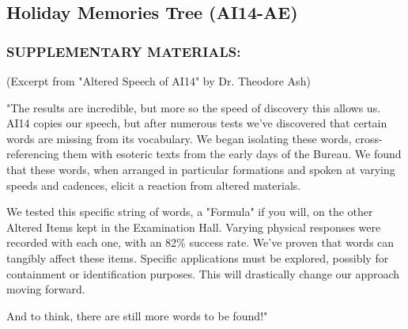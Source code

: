 \subsection*{Holiday Memories Tree (AI14-AE)}
\subsubsection*{SUPPLEMENTARY MATERIALS:}
\par (Excerpt from "Altered Speech of AI14" by Dr. Theodore Ash)
\par "The results are incredible, but more so the speed of discovery
this allows us. AI14 copies our speech, but after numerous tests
we've discovered that certain words are missing from its
vocabulary. We began isolating these words, cross-referencing
them with esoteric texts from the early days of the Bureau. We
found that these words, when arranged in particular formations
and spoken at varying speeds and cadences, elicit a reaction from
altered materials.
\par We tested this specific string of words, a "Formula" if you will, on
the other Altered Items kept in the Examination Hall. Varying
physical responses were recorded with each one, with an 82\%
success rate. We've proven that words can tangibly affect these
items. Specific applications must be explored, possibly for
containment or identification purposes. This will drastically change
our approach moving forward.
\par And to think, there are still more words to be found!"